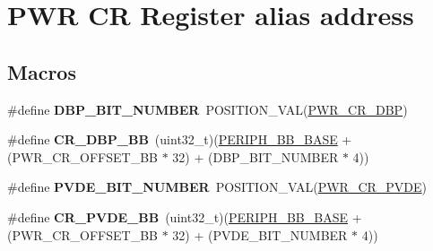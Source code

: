 \hypertarget{group___p_w_r___c_r__register__alias}{}\section{P\+WR CR Register alias address}
\label{group___p_w_r___c_r__register__alias}
\subsection*{Macros}
\begin{DoxyCompactItemize}
\item 
\#define {\bfseries D\+B\+P\+\_\+\+B\+I\+T\+\_\+\+N\+U\+M\+B\+ER}~P\+O\+S\+I\+T\+I\+O\+N\+\_\+\+V\+AL(\hyperlink{group___peripheral___registers___bits___definition_gaf5c65ab845794ef48f09faa2ee44f718}{P\+W\+R\+\_\+\+C\+R\+\_\+\+D\+BP})\hypertarget{group___p_w_r___c_r__register__alias_ga398aef263adbda7c1f1dc9020fde83f3}{}\label{group___p_w_r___c_r__register__alias_ga398aef263adbda7c1f1dc9020fde83f3}

\item 
\#define {\bfseries C\+R\+\_\+\+D\+B\+P\+\_\+\+BB}~(uint32\+\_\+t)(\hyperlink{group___peripheral__memory__map_gaed7efc100877000845c236ccdc9e144a}{P\+E\+R\+I\+P\+H\+\_\+\+B\+B\+\_\+\+B\+A\+SE} + (P\+W\+R\+\_\+\+C\+R\+\_\+\+O\+F\+F\+S\+E\+T\+\_\+\+BB $\ast$ 32) + (D\+B\+P\+\_\+\+B\+I\+T\+\_\+\+N\+U\+M\+B\+ER $\ast$ 4))\hypertarget{group___p_w_r___c_r__register__alias_ga799ab60bdbcfc1076cf2d7f206d09b0c}{}\label{group___p_w_r___c_r__register__alias_ga799ab60bdbcfc1076cf2d7f206d09b0c}

\item 
\#define {\bfseries P\+V\+D\+E\+\_\+\+B\+I\+T\+\_\+\+N\+U\+M\+B\+ER}~P\+O\+S\+I\+T\+I\+O\+N\+\_\+\+V\+AL(\hyperlink{group___peripheral___registers___bits___definition_ga05d5c39759e69a294c0ab9bea8f142e5}{P\+W\+R\+\_\+\+C\+R\+\_\+\+P\+V\+DE})\hypertarget{group___p_w_r___c_r__register__alias_gae731170c1675c5471fc06501228905b0}{}\label{group___p_w_r___c_r__register__alias_gae731170c1675c5471fc06501228905b0}

\item 
\#define {\bfseries C\+R\+\_\+\+P\+V\+D\+E\+\_\+\+BB}~(uint32\+\_\+t)(\hyperlink{group___peripheral__memory__map_gaed7efc100877000845c236ccdc9e144a}{P\+E\+R\+I\+P\+H\+\_\+\+B\+B\+\_\+\+B\+A\+SE} + (P\+W\+R\+\_\+\+C\+R\+\_\+\+O\+F\+F\+S\+E\+T\+\_\+\+BB $\ast$ 32) + (P\+V\+D\+E\+\_\+\+B\+I\+T\+\_\+\+N\+U\+M\+B\+ER $\ast$ 4))\hypertarget{group___p_w_r___c_r__register__alias_ga49f51ef8285a6be76fd204d49a00709c}{}\label{group___p_w_r___c_r__register__alias_ga49f51ef8285a6be76fd204d49a00709c}


\end{DoxyCompactItemize}
